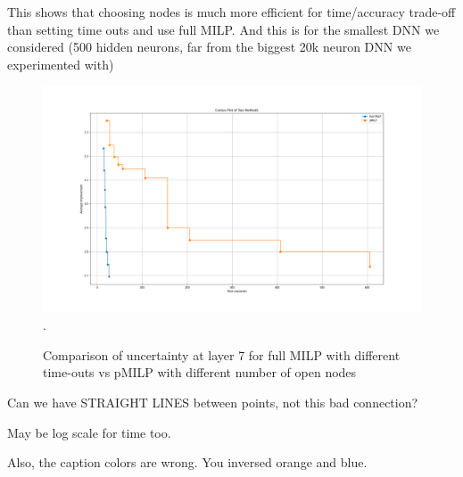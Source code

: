 This shows that choosing nodes is much more efficient for time/accuracy trade-off than setting time outs and use full MILP. And this is for the smallest DNN we considered (500 hidden neurons, far from the biggest 20k neuron DNN we experimented with)
	
	
	\begin{figure}[h]\hspace*{-0.8cm}
			\includegraphics[scale=0.4]{Layer7_comparison.png}.
			\caption{Comparison of uncertainty at layer 7 for full MILP with different time-outs vs pMILP with different number of open nodes}
			\label{fig3}
	\end{figure}
	
Can we have STRAIGHT LINES between points, not this bad connection?

May be log scale for time too.

Also, the caption colors are wrong. You inversed orange and blue.
